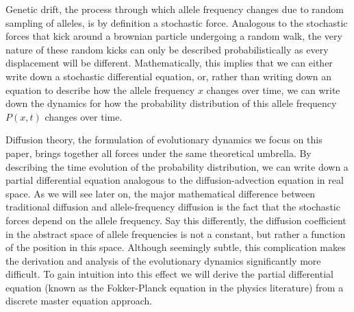 Genetic drift, the process through which allele frequency changes due to random
sampling of alleles, is by definition a stochastic force. Analogous to the
stochastic forces that kick around a brownian particle undergoing a random walk,
the very nature of these random kicks can only be described probabilistically as
every displacement will be different. Mathematically, this implies that we can
either write down a stochastic differential equation, or, rather than writing
down an equation to describe how the allele frequency $x$ changes over time, we
can write down the dynamics for how the probability distribution of this allele
frequency $P(x, t)$ changes over time.

Diffusion theory, the formulation of evolutionary dynamics we focus on this
paper, brings together all forces under the same theoretical umbrella. By
describing the time evolution of the probability distribution, we can write down
a partial differential equation analogous to the diffusion-advection equation in
real space. As we will see later on, the major mathematical difference between
traditional diffusion and allele-frequency diffusion is the fact that the
stochastic forces depend on the allele frequency. Say this differently, the
diffusion coefficient in the abstract space of allele frequencies is not a
constant, but rather a function of the position in this space. Although
seemingly subtle, this complication makes the derivation and analysis of the
evolutionary dynamics significantly more difficult. To gain intuition into this
effect we will derive the partial differential equation (known as the
Fokker-Planck equation in the physics literature) from a discrete master
equation approach.
